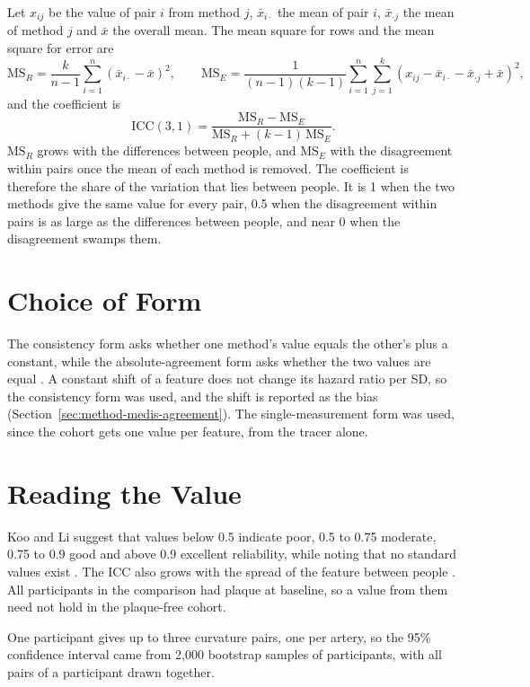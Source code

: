 Let $x_{ij}$ be the value of pair $i$ from method $j$, $\bar{x}_{i\cdot}$ the mean of pair $i$, $\bar{x}_{\cdot j}$ the mean of method $j$ and $\bar{x}$ the overall mean.
The mean square for rows and the mean square for error are
\begin{equation}
  \mathrm{MS}_R = \frac{k}{n-1} \sum_{i=1}^{n} \left(\bar{x}_{i\cdot} - \bar{x}\right)^2 ,
  \qquad
  \mathrm{MS}_E = \frac{1}{(n-1)(k-1)} \sum_{i=1}^{n} \sum_{j=1}^{k} \left(x_{ij} - \bar{x}_{i\cdot} - \bar{x}_{\cdot j} + \bar{x}\right)^2 ,
  \label{eq:app-icc-ms}
\end{equation}
and the coefficient is \cite[Table~3]{koo2016icc}
\begin{equation}
  \mathrm{ICC}(3,1) = \frac{\mathrm{MS}_R - \mathrm{MS}_E}{\mathrm{MS}_R + (k-1)\,\mathrm{MS}_E} .
  \label{eq:app-icc}
\end{equation}
$\mathrm{MS}_R$ grows with the differences between people, and $\mathrm{MS}_E$ with the disagreement within pairs once the mean of each method is removed.
The coefficient is therefore the share of the variation that lies between people.
It is 1 when the two methods give the same value for every pair, 0.5 when the disagreement within pairs is as large as the differences between people, and near 0 when the disagreement swamps them.

\section{Choice of Form}
\label{app:icc-form}

The consistency form asks whether one method's value equals the other's plus a constant, while the absolute-agreement form asks whether the two values are equal \cite{koo2016icc}.
A constant shift of a feature does not change its hazard ratio per SD, so the consistency form was used, and the shift is reported as the bias (Section~\ref{sec:method-medis-agreement}).
The single-measurement form was used, since the cohort gets one value per feature, from the tracer alone.

\section{Reading the Value}
\label{app:icc-reading}

Koo and Li suggest that values below 0.5 indicate poor, 0.5 to 0.75 moderate, 0.75 to 0.9 good and above 0.9 excellent reliability, while noting that no standard values exist \cite{koo2016icc}.
The ICC also grows with the spread of the feature between people \cite{koo2016icc}.
All participants in the comparison had plaque at baseline, so a value from them need not hold in the plaque-free cohort.

One participant gives up to three curvature pairs, one per artery, so the 95\% confidence interval came from 2,000 bootstrap samples of participants, with all pairs of a participant drawn together.
